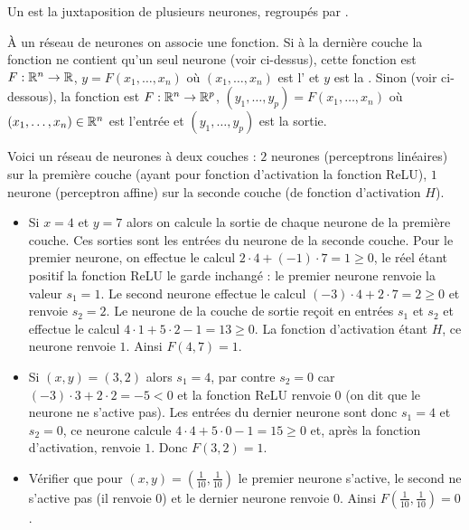 Un   est la juxtaposition de plusieurs neurones, regroupés par  . 




\`A un réseau de neurones on associe une fonction.
Si à la dernière couche la fonction ne contient qu'un seul neurone (voir ci-dessus), cette fonction est  
$F : \mathbb{R}^n \to \mathbb{R}$, $y = F(x_1,\ldots,x_n)$ où $(x_1,\ldots,x_n)$ est l'  et $y$ est la  .
Sinon (voir ci-dessous), la fonction est  
$F : \mathbb{R}^n \to \mathbb{R}^p$, $(y_1,\ldots,y_p) = F(x_1,\ldots,x_n)$ où $(x_1,\ldots,x_n) \in \mathbb{R}^n$ est l'entrée et $(y_1,\ldots,y_p)$ est la sortie.



\begin{exemple}{}{}
	Voici un réseau de neurones à deux couches : $2$ neurones (perceptrons linéaires) sur la première couche (ayant pour fonction d'activation la fonction ReLU), $1$ neurone (perceptron affine) sur la seconde couche  (de fonction d'activation $H$).
	
	
	
	
	\begin{itemize}
		\item Si $x=4$ et $y=7$ alors on calcule la sortie de chaque neurone de la première couche. Ces sorties sont les entrées du neurone de la seconde couche.
		Pour le premier neurone, on effectue le calcul $2\cdot4+(-1)\cdot7 = 1 \ge0$, le réel étant positif la fonction ReLU le garde inchangé : le premier neurone renvoie la valeur $s_1=1$. Le second neurone effectue le calcul $(-3)\cdot4+2\cdot7 = 2 \ge0$ et renvoie $s_2=2$.
		Le neurone de la couche de sortie reçoit en entrées $s_1$ et $s_2$ et effectue le calcul $4\cdot 1+5\cdot 2-1 = 13\ge0$. La fonction d'activation étant $H$, ce neurone renvoie $1$.  
		Ainsi $F(4,7)=1$.
		
		
		
		\item Si $(x,y)=(3,2)$ alors $s_1=4$, par contre $s_2=0$ car $(-3)\cdot3+2\cdot2 = -5 <0$ et la fonction ReLU renvoie $0$ (on dit que le neurone ne s'active pas). Les entrées du dernier neurone sont donc $s_1=4$ et $s_2=0$, ce neurone calcule $4\cdot 4 + 5\cdot0-1=15\ge0$ et, après la fonction d'activation, renvoie $1$. 
		Donc $F(3,2)=1$.
		
		\item Vérifier que pour $(x,y)=(\frac1{10},\frac1{10})$ le premier neurone s'active, le second ne s'active pas (il renvoie $0$) et le dernier neurone renvoie $0$. Ainsi $F(\frac1{10},\frac1{10})=0$.
	\end{itemize}
\end{exemple}



